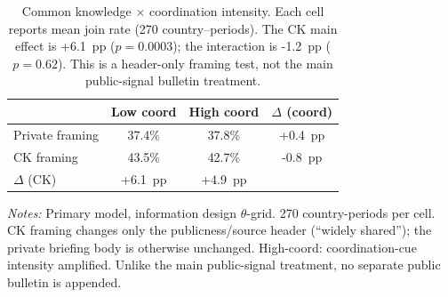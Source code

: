 \begin{table}[t]
\centering
\caption{Common knowledge $\times$ coordination intensity. Each cell reports mean join rate (270 country--periods). The CK main effect is +6.1~pp ($p = 0.0003$); the interaction is -1.2~pp ($p = 0.62$). This is a header-only framing test, not the main public-signal bulletin treatment.}
\label{tab:ck_2x2}
\small
\begin{tabular}{lccc}
\toprule
& Low coord & High coord & $\Delta$ (coord) \\
\midrule
Private framing & 37.4\% & 37.8\% & +0.4~pp \\
CK framing      & 43.5\% & 42.7\% & -0.8~pp \\
\midrule
$\Delta$ (CK) & +6.1~pp & +4.9~pp & \\
\bottomrule
\end{tabular}
\vspace{0.25em}
\parbox{\columnwidth}{\footnotesize\emph{Notes:} Primary model, information design $\theta$-grid. 270 country-periods per cell. CK framing changes only the publicness/source header (``widely shared''); the private briefing body is otherwise unchanged. High-coord: coordination-cue intensity amplified. Unlike the main public-signal treatment, no separate public bulletin is appended.}
\end{table}
